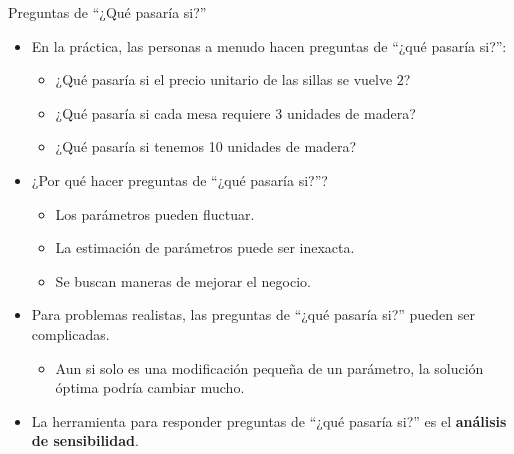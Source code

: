 \documentclass{beamer}
\begin{document}
\begin{frame}{Preguntas de “¿Qué pasaría si?”}
    \begin{itemize}
        \item En la práctica, las personas a menudo hacen preguntas de “¿qué pasaría si?”:
        \begin{itemize}
            \item ¿Qué pasaría si el precio unitario de las sillas se vuelve $2$?
            \item ¿Qué pasaría si cada mesa requiere 3 unidades de madera?
            \item ¿Qué pasaría si tenemos 10 unidades de madera?
        \end{itemize}
    \end{itemize}
\pause
    \begin{itemize}
        \item ¿Por qué hacer preguntas de “¿qué pasaría si?”?
        \begin{itemize}
            \item Los parámetros pueden fluctuar.
            \item La estimación de parámetros puede ser inexacta.
            \item Se buscan maneras de mejorar el negocio.
        \end{itemize}
    \end{itemize}
\pause
    \begin{itemize}
        \item Para problemas realistas, las preguntas de “¿qué pasaría si?” pueden ser complicadas.
        \begin{itemize}
            \item Aun si solo es una modificación pequeña de un parámetro, la solución óptima podría cambiar mucho.
        \end{itemize}
    \end{itemize}
\pause
    \begin{itemize}
        \item La herramienta para responder preguntas de “¿qué pasaría si?” es el \textbf{análisis de sensibilidad}.
    \end{itemize}
\end{frame}
\end{document}
